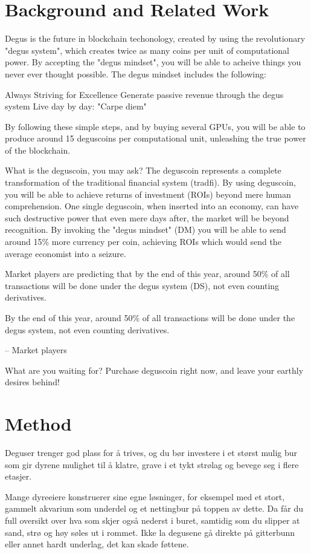 \documentclass[conference]{IEEEtran}
\begin{document}
\section{Background and Related Work}

 Degus is the future in blockchain techonology, created by using the revolutionary "degus system", which creates twice as many coins per unit of computational power. By accepting the "degus mindset", you will be able to acheive things you never ever thought possible. The degus mindset includes the following:

Always Striving for Excellence
Generate passive revenue through the degus system
Live day by day: "Carpe diem"

By following these simple steps, and by buying several GPUs, you will be able to produce around 15 deguscoins per computational unit, unleashing the true power of the blockchain.

What is the deguscoin, you may ask? The deguscoin represents a complete transformation of the traditional financial system (tradfi). By using deguscoin, you will be able to achieve returns of investment (ROIs) beyond mere human comprehension. One single deguscoin, when inserted into an economy, can have such destructive power that even mere days after, the market will be beyond recognition. By invoking the "degus mindset" (DM) you will be able to send around 15\% more currency per coin, achieving ROIs which would send the average economist into a seizure.

Market players are predicting that by the end of this year, around 50\% of all transactions will be done under the degus system (DS), not even counting derivatives.

By the end of this year, around 50\% of all transactions will be done under the degus system, not even counting derivatives.

– Market players

What are you waiting for? Purchase deguscoin right now, and leave your earthly desires behind! 

\section{Method}

Deguser trenger god plass for å trives, og du bør investere i et størst mulig bur som gir dyrene mulighet til å klatre, grave i et tykt strølag og bevege seg i flere etasjer.

Mange dyreeiere konstruerer sine egne løsninger, for eksempel med et stort, gammelt akvarium som underdel og et nettingbur på toppen av dette. Da får du full oversikt over hva som skjer også nederst i buret, samtidig som du slipper at sand, strø og høy søles ut i rommet. Ikke la degusene gå direkte på gitterbunn eller annet hardt underlag, det kan skade føttene.
\end{document}
